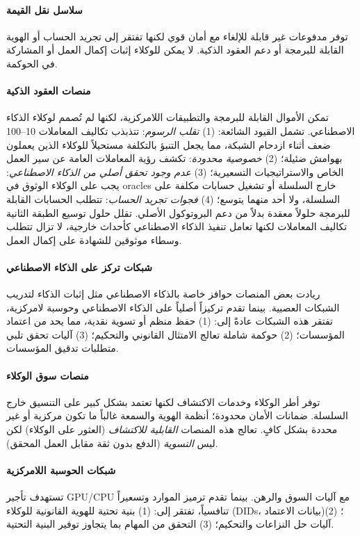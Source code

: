 \documentclass[11pt]{article}
\begin{document}
\paragraph{سلاسل نقل القيمة} توفر مدفوعات غير قابلة للإلغاء مع أمان قوي لكنها تفتقر إلى تجريد الحساب أو الهوية القابلة للبرمجة أو دعم العقود الذكية. لا يمكن للوكلاء إثبات إكمال العمل أو المشاركة في الحوكمة.

\paragraph{منصات العقود الذكية} تمكن الأموال القابلة للبرمجة والتطبيقات اللامركزية، لكنها لم تُصمم لوكلاء الذكاء الاصطناعي. تشمل القيود الشائعة: (1) \emph{تقلب الرسوم}: تتذبذب تكاليف المعاملات 10--100 ضعف أثناء ازدحام الشبكة، مما يجعل التنبؤ بالتكلفة مستحيلاً للوكلاء الذين يعملون بهوامش ضئيلة؛ (2) \emph{خصوصية محدودة}: تكشف رؤية المعاملات العامة عن سير العمل الخاص والاستراتيجيات التسعيرية؛ (3) \emph{عدم وجود تحقق أصلي من الذكاء الاصطناعي}: يجب على الوكلاء الوثوق في oracles خارج السلسلة أو تشغيل حسابات مكلفة على السلسلة، ولا أحد منهما يتوسع؛ (4) \emph{فجوات تجريد الحساب}: تتطلب الحسابات القابلة للبرمجة حلولاً معقدة بدلاً من دعم البروتوكول الأصلي. تقلل حلول توسيع الطبقة الثانية تكاليف المعاملات لكنها تعامل تنفيذ الذكاء الاصطناعي كأحداث خارجية، لا تزال تتطلب وسطاء موثوقين للشهادة على إكمال العمل.

\paragraph{شبكات تركز على الذكاء الاصطناعي} ريادت بعض المنصات حوافز خاصة بالذكاء الاصطناعي مثل إثبات الذكاء لتدريب الشبكات العصبية. بينما تقدم تركيزاً أصلياً على الذكاء الاصطناعي وحوسبة لامركزية، تفتقر هذه الشبكات عادةً إلى: (1) حفظ منظم أو تسوية نقدية، مما يحد من اعتماد المؤسسات؛ (2) حوكمة شاملة تعالج الامتثال القانوني والتحكيم؛ (3) آليات تحقق تلبي متطلبات تدقيق المؤسسات.

\paragraph{منصات سوق الوكلاء} توفر أطر الوكلاء وخدمات الاكتشاف لكنها تعتمد بشكل كبير على التنسيق خارج السلسلة. ضمانات الأمان محدودة؛ أنظمة الهوية والسمعة غالباً ما تكون مركزية أو غير محددة بشكل كافٍ. تعالج هذه المنصات \emph{القابلية للاكتشاف} (العثور على الوكلاء) لكن ليس \emph{التسوية} (الدفع بدون ثقة مقابل العمل المحقق).

\paragraph{شبكات الحوسبة اللامركزية} تستهدف تأجير GPU/CPU مع آليات السوق والرهن. بينما تقدم ترميز الموارد وتسعيراً تنافسياً، تفتقر إلى: (1) بنية تحتية للهوية القانونية للوكلاء (DIDs، بيانات الاعتماد)؛ (2) آليات حل النزاعات والتحكيم؛ (3) التحقق من المهام بما يتجاوز توفير البنية التحتية.
\end{document}
